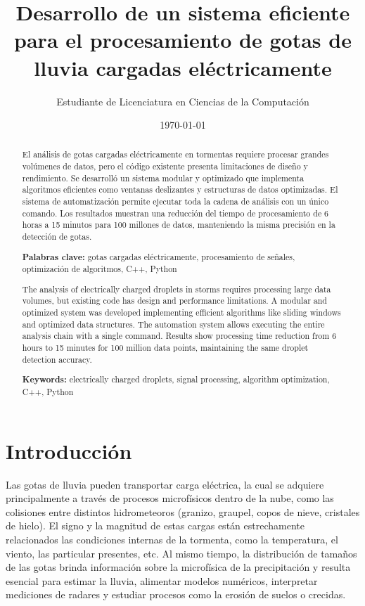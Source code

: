 \documentclass[12pt,a4paper]{article}
\title{\textbf{Desarrollo de un sistema eficiente para el procesamiento de gotas de lluvia cargadas eléctricamente}}
\author{Estudiante de Licenciatura en Ciencias de la Computación}
\date{\today}
\begin{document}
\onehalfspacing

\maketitle

\begin{abstract}
    El análisis de gotas cargadas eléctricamente en tormentas requiere procesar grandes volúmenes de datos, pero el código existente presenta limitaciones de diseño y rendimiento. Se desarrolló un sistema modular y optimizado que implementa algoritmos eficientes como ventanas deslizantes y estructuras de datos optimizadas. El sistema de automatización permite ejecutar toda la cadena de análisis con un único comando. Los resultados muestran una reducción del tiempo de procesamiento de 6 horas a 15 minutos para 100 millones de datos, manteniendo la misma precisión en la detección de gotas.

    \textbf{Palabras clave:} gotas cargadas eléctricamente, procesamiento de señales, optimización de algoritmos, C++, Python
\end{abstract}

\begin{abstract}
    The analysis of electrically charged droplets in storms requires processing large data volumes, but existing code has design and performance limitations. A modular and optimized system was developed implementing efficient algorithms like sliding windows and optimized data structures. The automation system allows executing the entire analysis chain with a single command. Results show processing time reduction from 6 hours to 15 minutes for 100 million data points, maintaining the same droplet detection accuracy.

    \textbf{Keywords:} electrically charged droplets, signal processing, algorithm optimization, C++, Python
\end{abstract}

\tableofcontents
\newpage

\section{Introducción}
\lhead{}

Las gotas de lluvia pueden transportar carga eléctrica, la cual se adquiere principalmente a través de procesos microfísicos dentro de la nube, como las colisiones entre distintos hidrometeoros (granizo, graupel, copos de nieve, cristales de hielo). El signo y la magnitud de estas cargas están estrechamente relacionados las condiciones internas de la tormenta, como la temperatura, el viento, las particular presentes, etc. Al mismo tiempo, la distribución de tamaños de las gotas brinda información sobre la microfísica de la precipitación y resulta esencial para estimar la lluvia, alimentar modelos numéricos, interpretar mediciones de radares y estudiar procesos como la erosión de suelos o crecidas.
\end{document}
